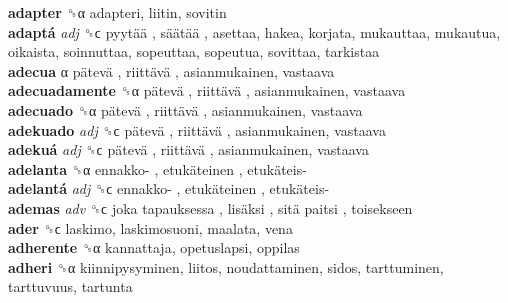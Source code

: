 \textbf{adapter} ␝α  adapteri, liitin, sovitin  \\
\textbf{adaptá} \emph{adj}  ␝ϲ   pyytää ,  säätää , asettaa, hakea, korjata, mukauttaa, mukautua, oikaista, soinnuttaa, sopeuttaa, sopeutua, sovittaa, tarkistaa  \\
\textbf{adecua} α   pätevä ,  riittävä , asianmukainen, vastaava  \\
\textbf{adecuadamente} ␝α   pätevä ,  riittävä , asianmukainen, vastaava  \\
\textbf{adecuado} ␝α   pätevä ,  riittävä , asianmukainen, vastaava  \\
\textbf{adekuado} \emph{adj}  ␝ϲ   pätevä ,  riittävä , asianmukainen, vastaava  \\
\textbf{adekuá} \emph{adj}  ␝ϲ   pätevä ,  riittävä , asianmukainen, vastaava  \\
\textbf{adelanta} ␝α   ennakko- ,  etukäteinen ,  etukäteis-   \\
\textbf{adelantá} \emph{adj}  ␝ϲ   ennakko- ,  etukäteinen ,  etukäteis-   \\
\textbf{ademas} \emph{adv}  ␝ϲ   joka tapauksessa ,  lisäksi ,  sitä paitsi , toisekseen  \\
\textbf{ader} ␝ϲ  laskimo, laskimosuoni, maalata, vena  \\
\textbf{adherente} ␝α  kannattaja, opetuslapsi, oppilas  \\
\textbf{adheri} ␝α  kiinnipysyminen, liitos, noudattaminen, sidos, tarttuminen, tarttuvuus, tartunta  \\
